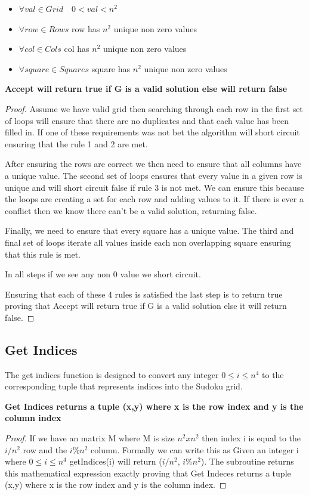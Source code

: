 \documentclass{sig-alternate}
\begin{document}
\begin{itemize}
\item{$\forall val \in Grid \quad 0 < val < n^2$} 
\item{$\forall row \in Rows$ row has $n^2$ unique non zero values}
\item{$\forall col \in Cols$ col has $n^2$ unique non zero values}
\item{$\forall square \in Squares$ square has $n^2$ unique non zero values}
\end{itemize}

\textbf{Accept will return true if G is a valid solution else will return false}
\begin{proof}
Assume we have valid grid then searching through each row in the first set of loops will ensure that there are no duplicates and that each value has been filled in. If one of these requirements was not bet the algorithm will short circuit ensuring that the rule 1 and 2 are met. 

After ensuring the rows are correct we then need to ensure that all columns have a unique value. The second set of loops ensures that every value in a given row is unique and will short circuit false if rule 3 is not met. We can ensure this because the loops are creating a set for each row and adding values to it. If there is ever a conflict then we know there can't be a valid solution, returning false.

Finally, we need to ensure that every square has a unique value. The third and final set of loops iterate all values inside each non overlapping square ensuring that this rule is met. 

In all steps if we see any non 0 value we short circuit. 

Ensuring that each of these 4 rules is satisfied the last step is to return true proving that Accept will return true if G is a valid solution else it will return false. 
\end{proof}

\subsection{Get Indices}
The get indices function is designed to convert any integer $0 \le i \le n^4$ to the corresponding tuple that represents indices into the Sudoku grid.

\textbf{Get Indices returns a tuple (x,y) where x is the row index and y is the column index}
\begin{proof}
If we have an matrix M where M is size $n^2 x n^2$ then index i is equal to the $i/n^2$ row and the $i\%n^2$ column. Formally we can write this as Given an integer i where $0 \le i \le n^4$ getIndices(i) will return ($i/n^2$, $i\%n^2$). The subroutine returns this mathematical expression exactly proving that Get Indeces returns a tuple (x,y) where x is the row index and y is the column index.
\end{proof}
\end{document}
